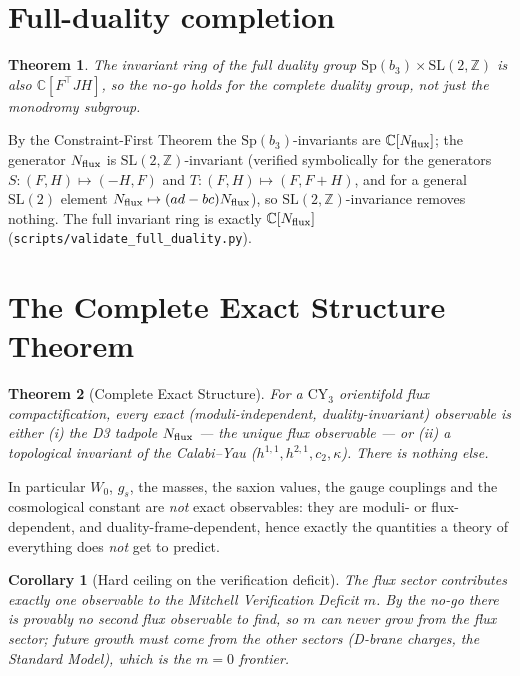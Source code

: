 \documentclass[11pt]{article}
\newtheorem{theorem}{Theorem}
\newtheorem{corollary}{Corollary}
\newcommand{\bthree}{b_3}
\newcommand{\flux}{F}
\newcommand{\hh}{H}
\begin{document}
\section{Full-duality completion}

\begin{theorem}
The invariant ring of the \emph{full} duality group $\mathrm{Sp}(\bthree)\times
\mathrm{SL}(2,\mathbb{Z})$ is also $\mathbb{C}[\flux^\top J\hh]$, so the no-go holds
for the complete duality group, not just the monodromy subgroup.
\end{theorem}

By the Constraint-First Theorem the $\mathrm{Sp}(\bthree)$-invariants are
$\mathbb{C}[N_{\rm flux}]$; the generator $N_{\rm flux}$ is $\mathrm{SL}(2,\mathbb{Z})$-invariant
(verified symbolically for the generators $S:(\flux,\hh)\mapsto(-\hh,\flux)$ and
$T:(\flux,\hh)\mapsto(\flux,\flux+\hh)$, and for a general $\mathrm{SL}(2)$ element
$N_{\rm flux}\mapsto(ad-bc)N_{\rm flux}$), so $\mathrm{SL}(2,\mathbb{Z})$-invariance
removes nothing. The full invariant ring is exactly $\mathbb{C}[N_{\rm flux}]$
(\texttt{scripts/validate\_full\_duality.py}).

\section{The Complete Exact Structure Theorem}

\begin{theorem}[Complete Exact Structure]
For a $\mathrm{CY}_3$ orientifold flux compactification, every exact
(moduli-independent, duality-invariant) observable is either (i) the D3 tadpole
$N_{\rm flux}$ --- the unique flux observable --- or (ii) a topological invariant of
the Calabi--Yau ($h^{1,1},h^{2,1},c_2,\kappa$). There is nothing else.
\end{theorem}

In particular $W_0$, $g_s$, the masses, the saxion values, the gauge couplings and
the cosmological constant are \emph{not} exact observables: they are moduli- or
flux-dependent, and duality-frame-dependent, hence exactly the quantities a theory
of everything does \emph{not} get to predict.

\begin{corollary}[Hard ceiling on the verification deficit]
The flux sector contributes exactly \emph{one} observable to the Mitchell
Verification Deficit $m$. By the no-go there is provably no second flux observable
to find, so $m$ can never grow from the flux sector; future growth must come from
the other sectors (D-brane charges, the Standard Model), which is the $m=0$ frontier.
\end{corollary}
\end{document}
